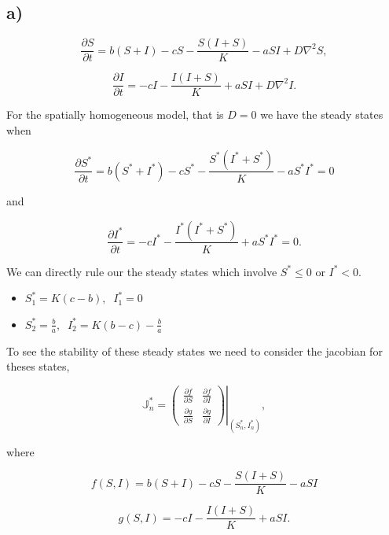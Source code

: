 \subsection*{a)}

\begin{equation}
\label{eq:partSt}
\frac{\partial S}{\partial t} = b(S+I)-cS -\frac{S(I+S)}{K}-aSI + D\nabla^2S,
\end{equation}

\begin{equation}
\label{eq:partIt}
\frac{\partial I}{\partial t}= -cI -\frac{I(I+S)}{K}+aSI +D\nabla^2I.
\end{equation}

For the spatially homogeneous model, that is $D=0$ we have the steady states when

$$
\frac{\partial S^*}{\partial t}=b(S^*+I^*)-cS^*-\frac{S^*(I^*+S^*)}{K}-aS^*I^* =0
$$

and

$$
\frac{\partial I^*}{\partial t}=-cI^*-\frac{I^*(I^*+S^*)}{K}+aS^*I^*=0.
$$

We can directly rule our the steady states which involve $S^*\leq0$ or $I^*<0$.

\begin{itemize}
\item $S^*_1=K(c-b), \;\; I^*_1=0$
\item $S^*_2=\frac{b}{a}, \;\; I^*_2=K(b-c)-\frac{b}{a}$ 
\end{itemize}



To see the stability of these steady states we need to consider the jacobian for theses states,

\begin{equation}
\mathbb{J}^*_n=\left.\left(
\begin{array}{cc}
\frac{\partial f}{\partial S} & \frac{\partial f}{\partial I} \\
\frac{\partial g}{\partial S} & \frac{\partial g}{\partial I}
\end{array}\right)\right|_{(S^*_n,I^*_n)},
\end{equation}

where 

\begin{equation}
f(S,I)=b(S+I)-cS-\frac{S(I+S)}{K}-aSI
\end{equation}

\begin{equation}
g(S,I)=-cI-\frac{I(I+S)}{K}+aSI.
\end{equation}

